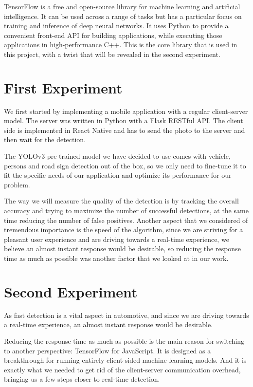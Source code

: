 \documentclass[runningheads,a4paper,11pt]{report}
\begin{document}
TensorFlow is a free and open-source library for machine learning and artificial intelligence. It can be used across a range of tasks but has a particular focus on training and inference of deep neural networks. It uses Python to provide a convenient front-end API for building applications, while executing those applications in high-performance C++. This is the core library that is used in this project, with a twist that will be revealed in the second experiment.

\section{First Experiment}
\label{section:firstExperiment}

We first started by implementing a mobile application with a regular client-server model. The server was written in Python with a Flask RESTful API. The client side is implemented in React Native and has to send the photo to the server and then wait for the detection. 

The YOLOv3 pre-trained model we have decided to use comes with vehicle, persons and road sign detection out of the box, so we only need to fine-tune it to fit the specific needs of our application and optimize its performance for our problem.

The way we will measure the quality of the detection is by tracking the overall accuracy and trying to maximize the number of successful detections, at the same time reducing the number of false positives. Another aspect that we considered of tremendous importance is the speed of the algorithm, since we are striving for a pleasant user experience and are driving towards a real-time experience,
we believe an almost instant response would be desirable, so reducing the response time as much as possible was another factor that we looked at in our work.


\section{Second Experiment}
\label{section:secondExperiment}

As fast detection is a vital aspect in automotive, and since we are driving towards a real-time experience, an almost instant response would be desirable. 

Reducing the response time as much as possible is the main reason for switching to another perspective: TensorFlow for JavaScript. It is designed as a breakthrough for running entirely client-sided machine learning models. And it is exactly what we needed to get rid of the client-server communication overhead, bringing us a few steps closer to real-time detection. 
\end{document}
